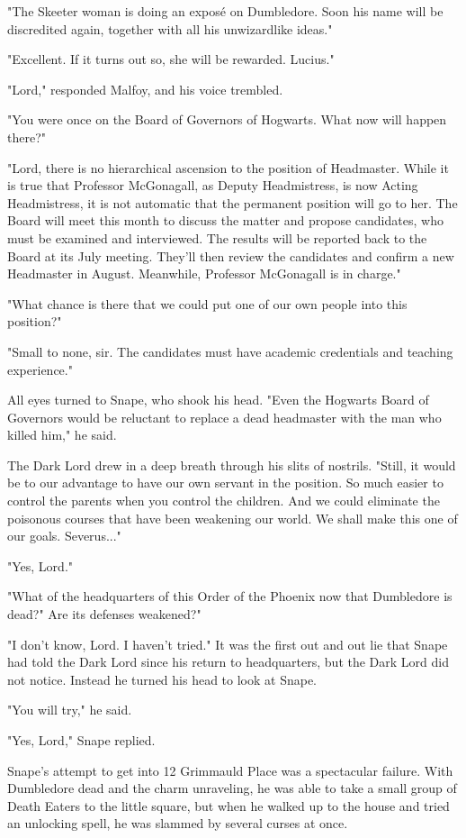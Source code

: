 \documentclass[a4paper,11pt]{article}
\begin{document}
"The Skeeter woman is doing an exposé on Dumbledore. Soon his name will be discredited again, together with all his unwizardlike ideas."

"Excellent. If it turns out so, she will be rewarded. Lucius."

"Lord," responded Malfoy, and his voice trembled.

"You were once on the Board of Governors of Hogwarts. What now will happen there?"

"Lord, there is no hierarchical ascension to the position of Headmaster. While it is true that Professor McGonagall, as Deputy Headmistress, is now Acting Headmistress, it is not automatic that the permanent position will go to her. The Board will meet this month to discuss the matter and propose candidates, who must be examined and interviewed. The results will be reported back to the Board at its July meeting. They'll then review the candidates and confirm a new Headmaster in August. Meanwhile, Professor McGonagall is in charge."

"What chance is there that we could put one of our own people into this position?"

"Small to none, sir. The candidates must have academic credentials and teaching experience."

All eyes turned to Snape, who shook his head. "Even the Hogwarts Board of Governors would be reluctant to replace a dead headmaster with the man who killed him," he said.

The Dark Lord drew in a deep breath through his slits of nostrils. "Still, it would be to our advantage to have our own servant in the position. So much easier to control the parents when you control the children. And we could eliminate the poisonous courses that have been weakening our world. We shall make this one of our goals. Severus..."

"Yes, Lord."

"What of the headquarters of this Order of the Phoenix now that Dumbledore is dead?" Are its defenses weakened?"

"I don't know, Lord. I haven't tried." It was the first out and out lie that Snape had told the Dark Lord since his return to headquarters, but the Dark Lord did not notice. Instead he turned his head to look at Snape.

"You will try," he said.

"Yes, Lord," Snape replied.

Snape's attempt to get into 12 Grimmauld Place was a spectacular failure. With Dumbledore dead and the charm unraveling, he was able to take a small group of Death Eaters to the little square, but when he walked up to the house and tried an unlocking spell, he was slammed by several curses at once.
\end{document}
